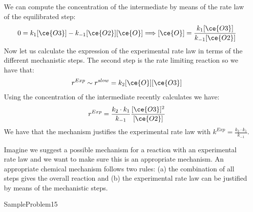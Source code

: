 \documentclass[main.tex]{subfiles}
\begin{document}
\begin{description}
We can compute the concentration of the intermediate by means of the rate law of the equilibrated step:
\[0=k_1[\ce{O3}]-k_{-1}[\ce{O2}][\ce{O}] \Longrightarrow	[\ce{O}]=\frac{k_1[\ce{O3}]}{k_{-1}[\ce{O2}]}\]
Now let us calculate the expression of the experimental rate law in terms of the different mechanistic steps. 
The second step is the rate limiting reaction so we have that:
 \[r^{Exp}\sim r^{slow}=k_2[\ce{O}][\ce{O3}]\]
Using the concentration of the intermediate recently calculates we have:
 \[r^{Exp}=\frac{k_2\cdot k_1}{k_{-1}}\frac{[\ce{O3}]^2}{[\ce{O2}]}\]
 We have that the mechanism justifies the experimental rate law with $k^{Exp}=\frac{k_2\cdot k_1}{k_{-1}}$.
 \item[\docfilehook{How to verify a possible mechanism }{}] 
Imagine we suggest a possible mechanism for a reaction with an experimental rate law and we want to make sure this is an appropriate mechanism. An appropriate chemical mechanism follows two rules: (a) the combination of all steps gives the overall reaction and (b) the experimental rate law can be justified by means of the mechanistic steps.

  {SampleProblem15}
  



\end{description}
\end{document}
